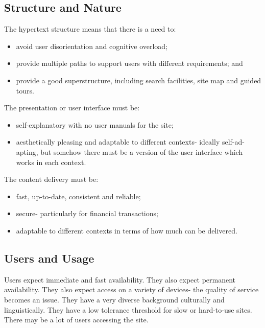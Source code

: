 \documentclass[a4paper, openany]{memoir}
\begin{document}
\subsection{Structure and Nature}
The hypertext structure means that there is a need to:
\begin{itemize}
    \item avoid user disorientation and cognitive overload;
    \item provide multiple paths to support users with different requirements; and
    \item provide a good superstructure, including search facilities, site map and guided tours.
\end{itemize}
The presentation or user interface must be:
\begin{itemize}
    \item self-explanatory with no user manuals for the site;
    \item aesthetically pleasing and adaptable to different contexts- ideally self-ad-apting, but somehow there must be a version of the user interface which works in each context.
\end{itemize}
The content delivery must be:
\begin{itemize}
    \item fast, up-to-date, consistent and reliable;
    \item secure- particularly for financial transactions;
    \item adaptable to different contexts in terms of how much can be delivered.
\end{itemize}

\subsection{Users and Usage}
Users expect immediate and fast availability. They also expect permanent availability. They also expect access on a variety of devices- the quality of service becomes an issue. They have a very diverse background culturally and linguistically. They have a low tolerance threshold for slow or hard-to-use sites. There may be a lot of users accessing the site.
\end{document}

